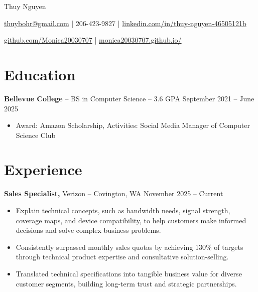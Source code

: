 \documentclass[11pt]{article}       %
\begin{document}
\centerline{\Huge Thuy Nguyen}

\vspace{5pt}

\centerline{\href{mailto:thuybohr@gmail.com}{thuybohr@gmail.com} | 206-423-9827 |
\href{https://www.linkedin.com/in/thuy-nguyen-46505121b/}{linkedin.com/in/thuy-nguyen-46505121b}}

\centerline{\href{https://github.com/Monica20030707}{github.com/Monica20030707} | 
\href{https://monica20030707.github.io/}{monica20030707.github.io/}} 

\vspace{-9pt}

\section*{Education}
\textbf{Bellevue College} -- BS in Computer Science -- 3.6 GPA \hfill September 2021 -- June 2025\\
\vspace{-9pt}
\begin{itemize}
  \item Award: Amazon Scholarship, Activities: Social Media Manager of Computer Science Club
\end{itemize}

\vspace{-18.5pt}

\section*{Experience}

\textbf{Sales Specialist,} {Verizon} -- Covington, WA \hfill November 2025 -- Current \\
\vspace{-9pt}
\begin{itemize}
  \item Explain technical concepts, such as bandwidth needs, signal strength, coverage maps, and device compatibility, to help customers make informed decisions and solve complex business problems.
  \item Consistently surpassed monthly sales quotas by achieving 130\% of targets through technical product expertise and consultative solution-selling.
  \item Translated technical specifications into tangible business value for diverse customer segments, building long-term trust and strategic partnerships.
\end{itemize}
\end{document}
